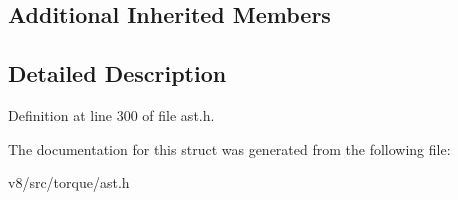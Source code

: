 \subsection*{Additional Inherited Members}


\subsection{Detailed Description}


Definition at line 300 of file ast.\+h.



The documentation for this struct was generated from the following file\+:\begin{DoxyCompactItemize}
\item 
v8/src/torque/ast.\+h\end{DoxyCompactItemize}
